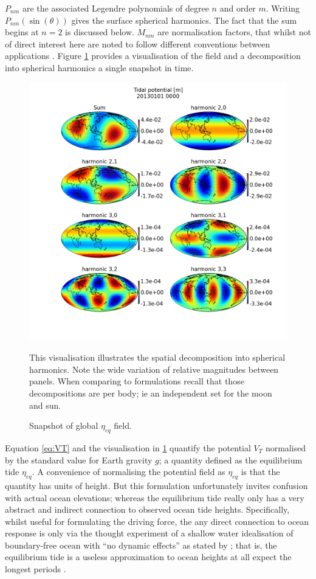 $P_{nm}$ are the associated Legendre polynomials of degree $n$ and order $m$.  Writing $P_{nm}(\sin(\theta))$ gives the surface spherical harmonics.  The fact that the sum begins at $n=2$ is discussed below.
$M_{nm}$ are normalisation factors, that whilst not of direct interest here are noted to follow different conventions between applications \citep{IERS2003}.
Figure \ref{fig:VTmaps} provides a visualisation of the field and a decomposition into spherical harmonics a single snapshot in time.
\begin{figure}[!hbt] \centering
    \includegraphics[width=\figwidthBig]{figures/maps/tidal_potential_spatial_20130101_0000.png}
    \caption{Snapshot of global $\eta_{eq}$ field.}{This visualisation illustrates the spatial decomposition into spherical harmonics.  Note the wide variation of relative magnitudes between panels. When comparing to formulations recall that those decompositions are per body; ie an independent set for the moon and sun. }
    \label{fig:VTmaps}
\end{figure}
Equation \ref{eq:VT} and the visualisation in \ref{fig:VTmaps} quantify the potential $V_T$ normalised by the standard value for Earth gravity $g$; a quantity defined as the equilibrium tide $\eta_{eq}$.  
A convenience of normalising the potential field as $\eta_{eq}$ is that the quantity has units of height. But this formulation unfortunately invites confusion with actual ocean elevations; whereas the equilibrium tide really only has a very abstract and indirect connection to observed ocean tide heights.
Specifically, whilst useful for formulating the driving force, the any direct connection to ocean response is only via the thought experiment of a shallow water idealisation of boundary-free ocean with ``no dynamic effects'' as stated by \citep[Eq 9.8.3]{gill1982atmosphere}; that is, the equilibrium tide is a useless approximation to ocean heights at all expect the longest periods \citep{Egbert:2003jd}.


